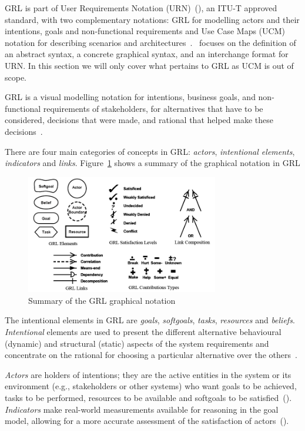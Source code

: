 \documentclass[dissertation,final]{softeng}
\begin{document}
GRL is part of User Requirements Notation (URN)~(), an ITU-T approved standard, with two complementary notations: GRL for modelling actors and their intentions, goals and non-functional requirements and Use Case Maps (UCM) notation for describing scenarios and architectures~\citep{Amyot2003}.~ focuses on the definition of an abstract syntax, a concrete graphical syntax, and an interchange format for URN. In this section we will only cover what pertains to GRL as UCM is out of scope. 

GRL is a visual modelling notation for intentions, business goals, and non-functional requirements of stakeholders, for alternatives that have to be considered, decisions that were made, and rational that helped make these decisions~\citep{amyot2011user}.

There are four main categories of concepts in GRL: \emph{actors}, \emph{intentional elements}, \emph{indicators} and \emph{links}. Figure~\ref{fig:grl_visualsyntax} shows a summary of the graphical notation in GRL

\begin{figure}[h]
\includegraphics[width=0.75\textwidth]{grl_visualsyntax}
\centering
\caption[Summary of the GRL graphical notation]{Summary of the GRL graphical notation~\citep{Roy:2007wyba}}
\label{fig:grl_visualsyntax}
\end{figure}

The intentional elements in GRL are \emph{goals}, \emph{softgoals}, \emph{tasks}, \emph{resources} and \emph{beliefs}. \emph{Intentional} elements are used to present the different alternative behavioural (dynamic) and structural (static) aspects of the system requirements and concentrate on the rational for choosing a particular alternative over the others~\citep{Saleh2004}.

\emph{Actors} are holders of intentions; they are the active entities in the system or its environment (e.g., stakeholders or other systems) who want goals to be achieved, tasks to be performed, resources to be available and softgoals to be satisfied~(). \emph{Indicators} make real-world measurements available for reasoning in the goal model, allowing for a more accurate assessment of the satisfaction of actors~(). 
\end{document}
